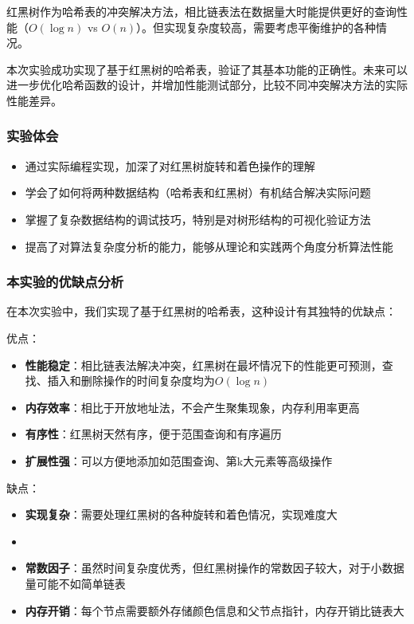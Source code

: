 \documentclass[12pt,a4paper]{article}
\begin{document}
红黑树作为哈希表的冲突解决方法，相比链表法在数据量大时能提供更好的查询性能（$O(\log n)$ vs $O(n)$）。但实现复杂度较高，需要考虑平衡维护的各种情况。

本次实验成功实现了基于红黑树的哈希表，验证了其基本功能的正确性。未来可以进一步优化哈希函数的设计，并增加性能测试部分，比较不同冲突解决方法的实际性能差异。

\subsubsection{实验体会}
\begin{itemize}
\item 通过实际编程实现，加深了对红黑树旋转和着色操作的理解
\item 学会了如何将两种数据结构（哈希表和红黑树）有机结合解决实际问题
\item 掌握了复杂数据结构的调试技巧，特别是对树形结构的可视化验证方法
\item 提高了对算法复杂度分析的能力，能够从理论和实践两个角度分析算法性能
\end{itemize}

\subsubsection{本实验的优缺点分析}
在本次实验中，我们实现了基于红黑树的哈希表，这种设计有其独特的优缺点：

优点：
\begin{itemize}
\item \textbf{性能稳定}：相比链表法解决冲突，红黑树在最坏情况下的性能更可预测，查找、插入和删除操作的时间复杂度均为$O(\log n)$
\item \textbf{内存效率}：相比于开放地址法，不会产生聚集现象，内存利用率更高
\item \textbf{有序性}：红黑树天然有序，便于范围查询和有序遍历
\item \textbf{扩展性强}：可以方便地添加如范围查询、第k大元素等高级操作
\end{itemize}

缺点：
\begin{itemize}
\item \textbf{实现复杂}：需要处理红黑树的各种旋转和着色情况，实现难度大
\item \item \textbf{常数因子}：虽然时间复杂度优秀，但红黑树操作的常数因子较大，对于小数据量可能不如简单链表
\item \textbf{内存开销}：每个节点需要额外存储颜色信息和父节点指针，内存开销比链表大
\end{itemize}
\end{document}
